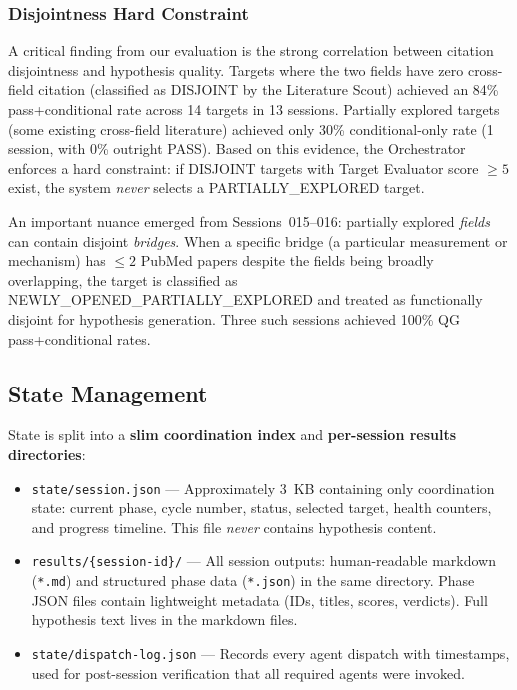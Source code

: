 \subsubsection{Disjointness Hard Constraint}

A critical finding from our evaluation is the strong correlation between citation disjointness and hypothesis quality. Targets where the two fields have zero cross-field citation (classified as DISJOINT by the Literature Scout) achieved an 84\% pass+conditional rate across 14 targets in 13 sessions. Partially explored targets (some existing cross-field literature) achieved only 30\% conditional-only rate (1 session, with 0\% outright PASS). Based on this evidence, the Orchestrator enforces a hard constraint: if DISJOINT targets with Target Evaluator score $\geq 5$ exist, the system \emph{never} selects a PARTIALLY\_EXPLORED target.

An important nuance emerged from Sessions~015--016: partially explored \emph{fields} can contain disjoint \emph{bridges}. When a specific bridge (a particular measurement or mechanism) has $\leq 2$ PubMed papers despite the fields being broadly overlapping, the target is classified as NEWLY\_\allowbreak{}OPENED\_\allowbreak{}PARTIALLY\_\allowbreak{}EXPLORED and treated as functionally disjoint for hypothesis generation. Three such sessions achieved 100\% QG pass+conditional rates.

\subsection{State Management}
\label{sec:state}

State is split into a \textbf{slim coordination index} and \textbf{per-session results directories}:

\begin{itemize}
    \item \texttt{state/session.json} --- Approximately 3~KB containing only coordination state: current phase, cycle number, status, selected target, health counters, and progress timeline. This file \emph{never} contains hypothesis content.

    \item \texttt{results/\{session-id\}/} --- All session outputs: human-readable markdown (\texttt{*.md}) and structured phase data (\texttt{*.json}) in the same directory. Phase JSON files contain lightweight metadata (IDs, titles, scores, verdicts). Full hypothesis text lives in the markdown files.

    \item \texttt{state/dispatch-log.json} --- Records every agent dispatch with timestamps, used for post-session verification that all required agents were invoked.
\end{itemize}

